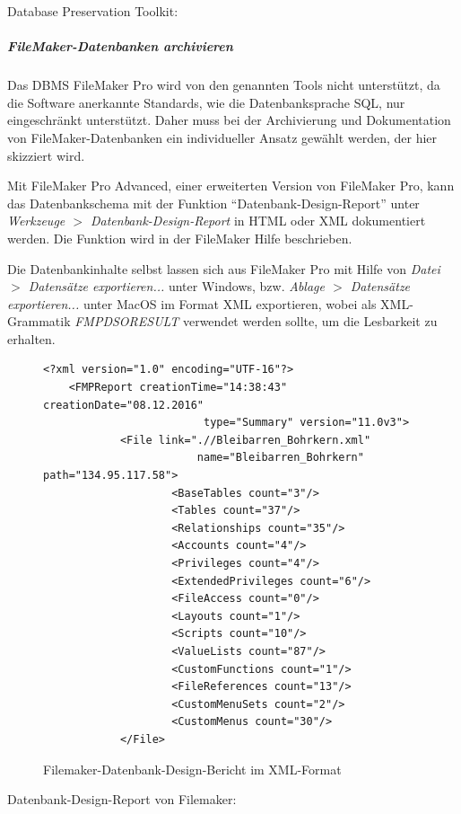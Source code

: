 \begin{flushleft}
Database Preservation Toolkit: 
\end{flushleft}


\subparagraph{FileMaker-Datenbanken archivieren}
Das DBMS FileMaker Pro wird von den genannten Tools nicht unterstützt, da die Software anerkannte Standards, wie die Datenbanksprache SQL, nur eingeschränkt unterstützt. Daher muss bei der Archivierung und Dokumentation von FileMaker-Datenbanken ein individueller Ansatz gewählt werden, der hier skizziert wird.

Mit FileMaker Pro Advanced, einer erweiterten Version von FileMaker Pro, kann das Datenbankschema mit der Funktion "`Datenbank-Design-Report"' unter \emph{Werkzeuge $>$ Datenbank-Design-Report} in HTML oder XML dokumentiert werden. Die Funktion wird in der FileMaker Hilfe beschrieben.

Die Datenbankinhalte selbst lassen sich aus FileMaker Pro mit Hilfe von \emph{Datei $>$ Datensätze exportieren...} unter Windows, bzw. \emph{Ablage $>$ Datensätze exportieren...} unter MacOS im Format XML exportieren, wobei als XML-Grammatik \emph{FMPDSORESULT} verwendet werden sollte, um die Lesbarkeit zu erhalten.

\begin{figure}[!hbt]
	\lstset{language=XML}
	\begin{lstlisting}[frame=L, xleftmargin=0.3cm, rulecolor=\color{ianusGrau}, mathescape, basicstyle=\scriptsize]
	<?xml version="1.0" encoding="UTF-16"?>
	<FMPReport creationTime="14:38:43" creationDate="08.12.2016" 
						 type="Summary" version="11.0v3">
			<File link=".//Bleibarren_Bohrkern.xml" 
						name="Bleibarren_Bohrkern" path="134.95.117.58">
					<BaseTables count="3"/>
					<Tables count="37"/>
					<Relationships count="35"/>
					<Accounts count="4"/>
					<Privileges count="4"/>
					<ExtendedPrivileges count="6"/>
					<FileAccess count="0"/>
					<Layouts count="1"/>
					<Scripts count="10"/>
					<ValueLists count="87"/>
					<CustomFunctions count="1"/>
					<FileReferences count="13"/>
					<CustomMenuSets count="2"/>
					<CustomMenus count="30"/>
			</File>
	\end{lstlisting}
  \caption{Filemaker-Datenbank-Design-Bericht im XML-Format}
	\label{abb:datenbanken-berichtXML}
\end{figure}

\begin{flushleft}
Datenbank-Design-Report von Filemaker: 
\end{flushleft}


